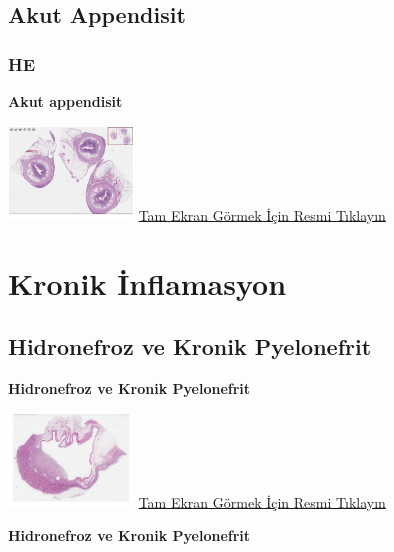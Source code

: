 \documentclass[
  letterpaper,
  DIV=11,
  numbers=noendperiod]{scrreprt}
\begin{document}
\hypertarget{sec-akut-appendisit}{%
\section{Akut Appendisit}\label{sec-akut-appendisit}}

\hypertarget{he-3}{%
\subsection{HE}\label{he-3}}

\textbf{Akut appendisit}

\href{https://images.patolojiatlasi.com/acute-appendicitis/HE.html}{\includegraphics[width=0.25\textwidth,height=\textheight]{./screenshots/acute-appendicitis_screenshot.png}}
\href{https://images.patolojiatlasi.com/acute-appendicitis/HE.html}{Tam
Ekran Görmek İçin Resmi Tıklayın}

\hypertarget{sec-kronik-inflamasyon}{%
\chapter{Kronik İnflamasyon}\label{sec-kronik-inflamasyon}}

\hypertarget{sec-hidronefroz-kronik-pyelonefrit}{%
\section{Hidronefroz ve Kronik
Pyelonefrit}\label{sec-hidronefroz-kronik-pyelonefrit}}

\textbf{Hidronefroz ve Kronik Pyelonefrit}

\href{https://images.patolojiatlasi.com/chronicpyelonephritis/HE1.html}{\includegraphics[width=0.25\textwidth,height=\textheight]{./screenshots/chronicpyelonephritis-1_screenshot.png}}
\href{https://images.patolojiatlasi.com/chronicpyelonephritis/HE1.html}{Tam
Ekran Görmek İçin Resmi Tıklayın}

\textbf{Hidronefroz ve Kronik Pyelonefrit}
\end{document}
